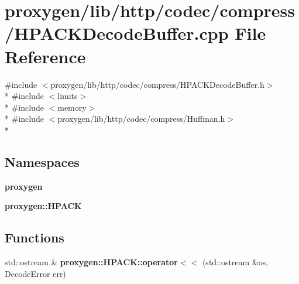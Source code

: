 \section{proxygen/lib/http/codec/compress/\+H\+P\+A\+C\+K\+Decode\+Buffer.cpp File Reference}
\label{HPACKDecodeBuffer_8cpp}
{\ttfamily \#include $<$proxygen/lib/http/codec/compress/\+H\+P\+A\+C\+K\+Decode\+Buffer.\+h$>$}\\*
{\ttfamily \#include $<$limits$>$}\\*
{\ttfamily \#include $<$memory$>$}\\*
{\ttfamily \#include $<$proxygen/lib/http/codec/compress/\+Huffman.\+h$>$}\\*
\subsection*{Namespaces}
\begin{DoxyCompactItemize}
\item 
 {\bf proxygen}
\item 
 {\bf proxygen\+::\+H\+P\+A\+CK}
\end{DoxyCompactItemize}
\subsection*{Functions}
\begin{DoxyCompactItemize}
\item 
std\+::ostream \& {\bf proxygen\+::\+H\+P\+A\+C\+K\+::operator$<$$<$} (std\+::ostream \&os, Decode\+Error err)
\end{DoxyCompactItemize}
